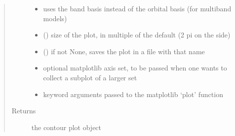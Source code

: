 \documentclass[letterpaper,10pt,english]{sphinxmanual}
\begin{document}
\begin{fulllineitems}
\begin{quote}
\begin{description}
\begin{itemize}
\item {} 
\sphinxAtStartPar
{} \textendash{} uses the band basis instead of the orbital basis (for multiband models)

\item {} 
\sphinxAtStartPar
{} () \textendash{} size of the plot, in multiple of the default (2 pi on the side)

\item {} 
\sphinxAtStartPar
{} () \textendash{} if not None, saves the plot in a file with that name

\item {} 
\sphinxAtStartPar
{} \textendash{} optional matplotlib axis set, to be passed when one wants to collect a subplot of a larger set

\item {} 
\sphinxAtStartPar
{} \textendash{} keyword arguments passed to the matplotlib ‘plot’ function

\end{itemize}

\item[{Returns}] \leavevmode
\sphinxAtStartPar
the contour plot object

\end{description}\end{quote}

\end{fulllineitems}

\end{document}
